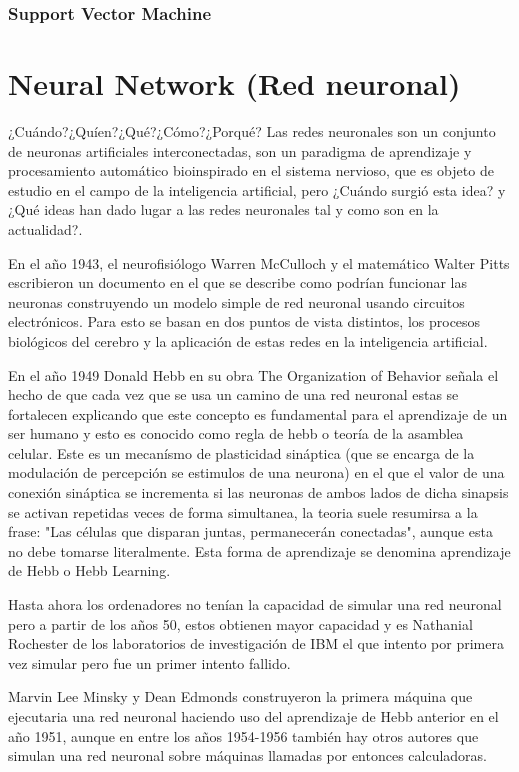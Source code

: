 \documentclass[a4paper, 11pt]{article} %
\begin{document}
\subsubsection{Support Vector Machine}

\section{Neural Network (Red neuronal)}
¿Cuándo?¿Quíen?¿Qué?¿Cómo?¿Porqué?
Las redes neuronales son un conjunto de neuronas artificiales interconectadas, son un paradigma de aprendizaje y procesamiento automático bioinspirado en el sistema nervioso, que es objeto de estudio en el campo de la inteligencia artificial, pero ¿Cuándo surgió esta idea? y ¿Qué ideas han dado lugar a las redes neuronales tal y como son en la actualidad?.

En el año 1943, el neurofisiólogo Warren McCulloch y el matemático Walter Pitts escribieron un documento en el que se describe como podrían funcionar las neuronas construyendo un modelo simple de red neuronal usando circuitos electrónicos. Para esto se basan en dos puntos de vista distintos, los procesos biológicos del cerebro y la aplicación de estas redes en la inteligencia artificial.

En el año 1949 Donald Hebb en su obra The Organization of Behavior señala el hecho de que cada vez que se usa un camino de una red neuronal estas se fortalecen explicando que este concepto es fundamental para el aprendizaje de un ser humano y esto es conocido como regla de hebb o teoría de la asamblea celular. Este es un mecanísmo de plasticidad sináptica (que se encarga de la modulación de percepción se estimulos de una neurona) en el que el valor de una conexión sináptica se incrementa si las neuronas de ambos lados de dicha sinapsis se activan repetidas veces de forma simultanea, la teoria suele resumirsa a la frase: "Las células que disparan juntas, permanecerán conectadas", aunque esta no debe tomarse literalmente. Esta forma de aprendizaje se denomina aprendizaje de Hebb o Hebb Learning.

Hasta ahora los ordenadores no tenían la capacidad de simular una red neuronal pero a partir de los años 50, estos obtienen mayor capacidad y es Nathanial Rochester de los laboratorios de investigación de IBM el que intento por primera vez simular pero fue un primer intento fallido.

Marvin Lee Minsky y Dean Edmonds construyeron la primera máquina que ejecutaria una red neuronal haciendo uso del aprendizaje de Hebb anterior en el año 1951, aunque en entre los años 1954-1956 también hay otros autores que simulan una red neuronal sobre máquinas llamadas por entonces calculadoras.
\end{document}
